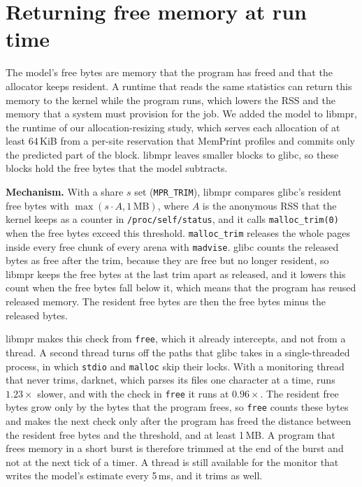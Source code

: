 \documentclass[11pt]{article}
\newcommand{\memprint}{MemPrint}
\begin{document}
\section{Returning free memory at run time}
\label{sec:trim}

The model's free bytes are memory that the program has freed and that the allocator keeps resident. A runtime that
reads the same statistics can return this memory to the kernel while the program runs, which lowers the RSS and the
memory that a system must provision for the job. We added the model to libmpr, the runtime of our allocation-resizing
study, which serves each allocation of at least 64\,KiB from a per-site reservation that \memprint{} profiles and
commits only the predicted part of the block. libmpr leaves smaller blocks to glibc, so these blocks hold the free
bytes that the model subtracts.

\textbf{Mechanism.} With a share $s$ set (\texttt{MPR\_TRIM}), libmpr compares glibc's resident free bytes with
$\max(s \cdot A, 1\,\mathrm{MB})$, where $A$ is the anonymous RSS that the kernel keeps as a counter in
\texttt{/proc/self/status}, and it calls \texttt{malloc\_trim(0)} when the free bytes exceed this threshold.
\texttt{malloc\_trim} releases the whole pages inside every free chunk of every arena with \texttt{madvise}. glibc
counts the released bytes as free after the trim, because they are free but no longer resident, so libmpr keeps the
free bytes at the last trim apart as released, and it lowers this count when the free bytes fall below it, which
means that the program has reused released memory. The resident free bytes are then the free bytes minus the
released bytes.

libmpr makes this check from \texttt{free}, which it already intercepts, and not from a thread. A second thread
turns off the paths that glibc takes in a single-threaded process, in which \texttt{stdio} and \texttt{malloc} skip
their locks. With a monitoring thread that never trims, darknet, which parses its files one character at a time,
runs $1.23\times$ slower, and with the check in \texttt{free} it runs at $0.96\times$. The resident free bytes grow
only by the bytes that the program frees, so \texttt{free} counts these bytes and makes the next check only after the
program has freed the distance between the resident free bytes and the threshold, and at least 1\,MB. A program that
frees memory in a short burst is therefore trimmed at the end of the burst and not at the next tick of a timer. A
thread is still available for the monitor that writes the model's estimate every 5\,ms, and it trims as well.
\end{document}
